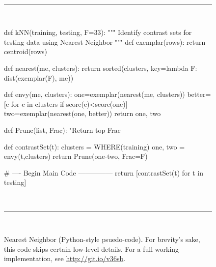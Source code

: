 \begin{figure}[t] 
~\hrule~
\begin{minipage}[t]{.45\linewidth}
\begin{code}[left]
def kNN(training, testing, F=33):
  """ Identify contrast sets for testing
      data using Nearest Neighbor """
  def exemplar(rows):
    return centroid(rows)
  
  def nearest(me, clusters):
    return sorted(clusters,
                  key=lambda F: dist(exemplar(F), me))
  
  def envy(me, clusters):
    one=exemplar(nearest(me, clusters))
    better=[c for c in clusters if score(c)<score(one)]
    two=exemplar(nearest(one, better))
    return one, two
  
  def Prune(list, Frac):
    "Return top Frac %
    
  def contrastSet(t):
    clusters = WHERE(training)
    one, two = envy(t,clusters)
    return Prune(one-two, Frac=F)
  
  # ---- Begin Main Code ---------------
  return [contrastSet(t) for t in testing]
\end{code}
\end{minipage}
~\hrule~
\caption{Nearest Neighbor (Python-style psuedo-code).
For brevity's sake, this code skips certain low-level details.
For a full working implementation, see \url{http://git.io/v36sb}.}
\label{fig:knncode}
\end{figure}